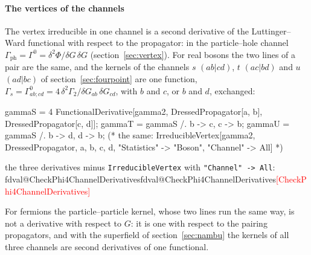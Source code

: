 \documentclass[11pt,a4paper]{article}
\makeatletter
\newcommand{\pkg}[1]{\texttt{#1}}
\newcommand{\ph}{\mathrm{ph}}
\newcommand{\val}[1]{\ifcsname fdval@#1\endcsname\csname fdval@#1\endcsname\else\textcolor{red}{[#1]}\fi}
\makeatother
\begin{document}
\paragraph{The vertices of the channels} The vertex irreducible in one channel is a second derivative of the
Luttinger--Ward functional with respect to the propagator: in the particle--hole channel $\Gamma_{\ph}=\Gamma^0=\delta^2\Phi/
\delta G\,\delta G$ (section~\ref{sec:vertex}). For real bosons the two lines of a pair are the same, and the kernels of the
channels $s$ $(ab|cd)$, $t$ $(ac|bd)$ and $u$ $(ad|bc)$ of section~\ref{sec:fourpoint} are one function, $\Gamma_s=\Gamma^0_{ab;cd}=
4\,\delta^2\Gamma_2/\delta G_{ab}\,\delta G_{cd}$, with $b$ and $c$, or $b$ and $d$, exchanged:
\begin{code}
gammaS = 4 FunctionalDerivative[gamma2, DressedPropagator[a, b], DressedPropagator[c, d]];
gammaT = gammaS /. {b -> c, c -> b}; gammaU = gammaS /. {b -> d, d -> b};
(* the same: IrreducibleVertex[gamma2, DressedPropagator, {a, b, c, d},
    "Statistics" -> "Boson", "Channel" -> All] *)
\end{code}
\begin{result}
the three derivatives minus \pkg{IrreducibleVertex} with \pkg{"Channel" -> All}: \val{CheckPhi4ChannelDerivatives}
\end{result}
For fermions the particle--particle kernel, whose two lines run the same way, is not a derivative with respect to $G$: it is
one with respect to the pairing propagators, and with the superfield of section~\ref{sec:nambu} the kernels of all three
channels are second derivatives of one functional.
\end{document}
